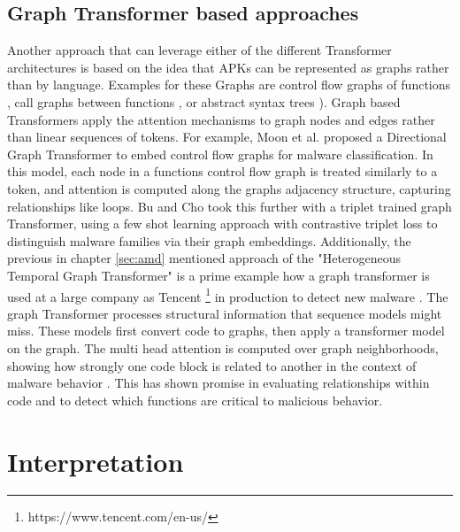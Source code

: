 \subsection{Graph Transformer based approaches}


Another approach that can leverage either of the different Transformer architectures is based 
on the idea that APKs can be represented as graphs rather than by language.
Examples for these Graphs are control flow graphs of functions \cite{scgformer}, 
call graphs between functions \cite{graphbert}, 
or abstract syntax trees \cite{tbased_codesum}). 
Graph based Transformers apply the attention mechanisms to graph nodes and edges rather than 
linear sequences of tokens. 
For example, Moon et al. \cite{controlflowbert} proposed a Directional Graph Transformer 
to embed control flow graphs for malware classification. 
In this model, each node in a functions control flow graph 
is treated similarly to a token, and attention is computed along the graphs adjacency structure, 
capturing relationships like loops. 
Bu and Cho 
\cite{trplet_graph_tran} 
took this further with a triplet trained graph Transformer, 
using a few shot learning approach with contrastive triplet loss to distinguish 
malware families via their graph embeddings. 
Additionally, the previous in chapter \ref{sec:amd} mentioned approach of the 
"Heterogeneous Temporal Graph Transformer" is a prime example how a graph transformer is 
used at a large company as Tencent \footnote{https://www.tencent.com/en-us/} in production to detect new malware \cite{htgt}.
The graph Transformer processes structural information that sequence models might miss.
These models first convert code to graphs,
then apply a transformer model on the graph. 
The multi head attention is computed over graph neighborhoods, 
showing how strongly one code block is related to another in the context of 
malware behavior 
\cite{transformer_malware_overview}. 
This has shown promise in evaluating relationships within code and to detect which functions 
are critical to malicious behavior. 

\section{Interpretation}

